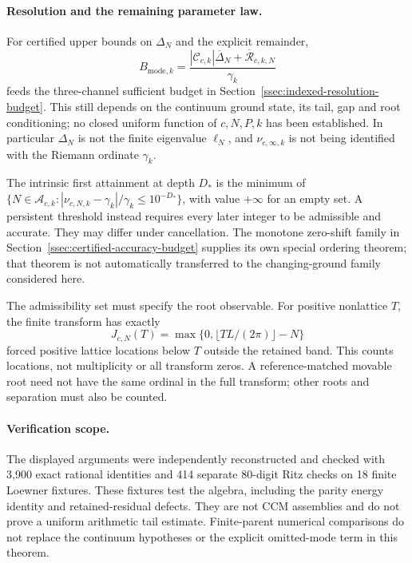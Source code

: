 \paragraph{Resolution and the remaining parameter law.}
For certified upper bounds on $\Delta_N$ and the explicit remainder,
\[
 B_{\mathrm{mode},k}
 =\frac{|\mathcal C_{c,k}|\overline\Delta_N+
              \overline{\mathcal R}_{c,k,N}}{\gamma_k}
\]
feeds the three-channel sufficient budget in
Section~\ref{ssec:indexed-resolution-budget}. This still depends on the
continuum ground state, its tail, gap and root conditioning; no closed
uniform function of $c,N,P,k$ has been established. In particular
$\Delta_N$ is not the finite eigenvalue $\ell_N$, and $\nu_{c,\infty,k}$
is not being identified with the Riemann ordinate $\gamma_k$.

The intrinsic first attainment at depth $D_*$ is the minimum of
$\{N\in\mathcal A_{c,k}:|\nu_{c,N,k}-\gamma_k|/\gamma_k\le10^{-D_*}\}$,
with value $+\infty$ for an empty set. A persistent threshold instead
requires every later integer to be admissible and accurate. They may
differ under cancellation. The monotone zero-shift family in
Section~\ref{ssec:certified-accuracy-budget} supplies its own special
ordering theorem; that theorem is not automatically transferred to the
changing-ground family considered here.

The admissibility set must specify the root observable. For positive
nonlattice $T$, the finite transform has exactly
\[
 J_{c,N}(T)=\max\{0,\lfloor T L/(2\pi)\rfloor-N\}
\]
forced positive lattice locations below $T$ outside the retained band.
This counts locations, not multiplicity or all transform zeros. A
reference-matched movable root need not have the same ordinal in the
full transform; other roots and separation must also be counted.

\paragraph{Verification scope.}
The displayed arguments were independently reconstructed and checked with
3,900 exact rational identities and 414 separate 80-digit Ritz checks
on 18 finite Loewner fixtures. These fixtures test the algebra, including
the parity energy identity and retained-residual defects. They are not
CCM assemblies and do not prove a uniform arithmetic tail estimate.
Finite-parent numerical comparisons do not replace the continuum
hypotheses or the explicit omitted-mode term in this theorem.

